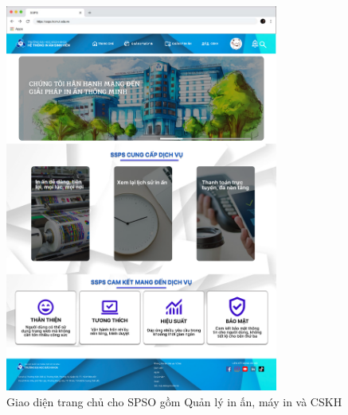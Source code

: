 \begin{figure}[H]
    \begin{center}
        \includegraphics[width=0.8\textwidth]{Images/Figma/Homepage_spso.png}
        \caption{Giao diện trang chủ cho SPSO gồm Quản lý in ấn, máy in và CSKH}
        \label{fig:arch}
    \end{center}
\end{figure}
